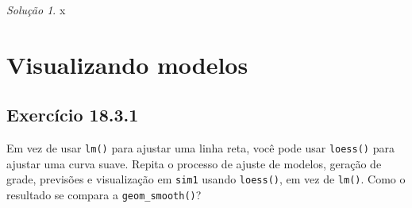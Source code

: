 \documentclass[
]{latex/krantz}
\theoremstyle{definition}
\theoremstyle{definition}
\theoremstyle{definition}
\theoremstyle{definition}
\theoremstyle{remark}
\newtheorem*{solution}{Solução}
\begin{document}
\begin{solution}
x
\end{solution}

\hypertarget{visualizando-modelos}{%
\section{Visualizando modelos}\label{visualizando-modelos}}

\hypertarget{exr18-3-1}{%
\subsection*{Exercício 18.3.1}\label{exr18-3-1}}

Em vez de usar \texttt{lm()} para ajustar uma linha reta, você pode usar \texttt{loess()} para ajustar uma curva suave. Repita o processo de ajuste de modelos, geração de grade, previsões e visualização em \texttt{sim1} usando \texttt{loess()}, em vez de \texttt{lm()}. Como o resultado se compara a \texttt{geom\_smooth()}?
\end{document}
